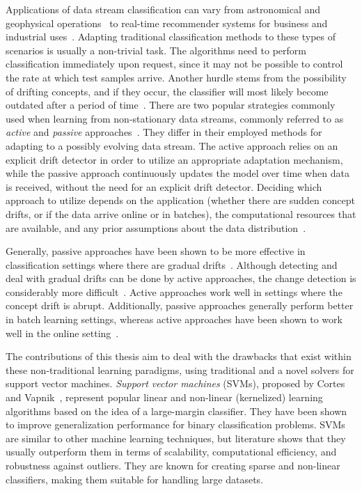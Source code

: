 \documentclass[reqno]{vcuthesis}
\numberwithin{equation}{chapter}
\begin{document}
Applications of data stream classification can vary from astronomical and geophysical operations~\cite{burl1999diamond} to real-time recommender systems for business and industrial uses~\cite{kargupta2002mobimine,kargupta2004vedas}. Adapting traditional classification methods to these types of scenarios is usually a non-trivial task. The algorithms need to perform classification immediately upon request, since it may not be possible to control the rate at which test samples arrive. Another hurdle stems from the possibility of drifting concepts, and if they occur, the classifier will most likely become outdated after a period of time~\cite{gama2014survey}. There are two popular strategies commonly used when learning from non-stationary data streams, commonly referred to as \textit{active} and \textit{passive} approaches~\cite{ditzler2015learning,elwell2011incremental}. They differ in their employed methods for adapting to a possibly evolving data stream. The active approach relies on an explicit drift detector in order to utilize an appropriate adaptation mechanism, while the passive approach continuously updates the model over time when data is received, without the need for an explicit drift detector. Deciding which approach to utilize depends on the application (whether there are sudden concept drifts, or if the data arrive online or in batches), the computational resources that are available, and any prior assumptions about the data distribution~\cite{alippi2014intelligence}. 

Generally, passive approaches have been shown to be more effective in classification settings where there are gradual drifts~\cite{elwell2011incremental}. Although detecting and deal with gradual drifts can be done by active approaches, the change detection is considerably more difficult~\cite{alippi2009just}. Active approaches work well in settings where the concept drift is abrupt. Additionally, passive approaches generally perform better in batch learning settings, whereas active approaches have been shown to work well in the online setting~\cite{bifet2007learning,gama2004learning}.

The contributions of this thesis aim to deal with the drawbacks that exist within these non-traditional learning paradigms, using traditional and a novel solvers for support vector machines. \textit{Support vector machines} (SVMs), proposed by Cortes and Vapnik~\cite{Cortes1995}, represent popular linear and non-linear (kernelized) learning algorithms based on the idea of a large-margin classifier. They have been shown to improve generalization performance for binary classification problems. SVMs are similar to other machine learning techniques, but literature shows that they usually outperform them in terms of scalability, computational efficiency, and robustness against outliers. They are known for creating sparse and non-linear classifiers, making them suitable for handling large datasets. 
\end{document}
